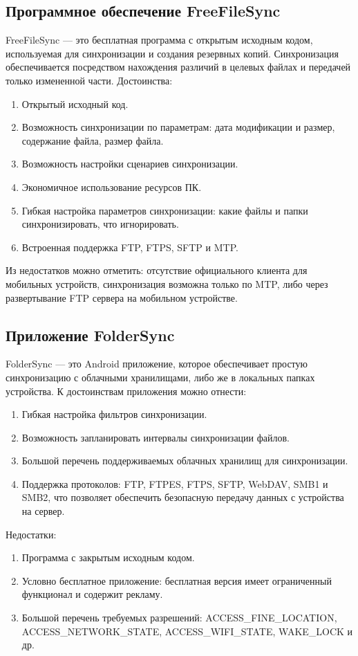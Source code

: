 \subsection{Программное обеспечение FreeFileSync}
FreeFileSync --- это бесплатная программа с открытым исходным кодом, используемая для синхронизации и создания резервных копий\cite{freefilesync}. Синхронизация обеспечивается посредством нахождения различий в целевых файлах и передачей только измененной части.
Достоинства:
\begin{enumerate}
	\item Открытый исходный код.
	\item Возможность синхронизации по параметрам: дата модификации и размер, содержание файла, размер файла.
	\item Возможность настройки сценариев синхронизации.
	\item Экономичное использование ресурсов ПК.
	\item Гибкая настройка параметров синхронизации: какие файлы и папки синхронизировать, что игнорировать.
	\item Встроенная поддержка FTP, FTPS, SFTP и MTP.
\end{enumerate}

Из недостатков можно отметить: отсутствие официального клиента для мобильных устройств, синхронизация возможна только по MTP, либо через развертывание FTP сервера на мобильном устройстве.

\subsection{Приложение FolderSync}
FolderSync --- это Android приложение, которое обеспечивает простую синхронизацию с облачными хранилищами, либо же в локальных папках устройства\cite{foldersync}.
К достоинствам приложения можно отнести:
\begin{enumerate}
	\item Гибкая настройка фильтров синхронизации.
	\item Возможность запланировать интервалы синхронизации файлов.
	\item Большой перечень поддерживаемых облачных хранилищ для синхронизации.
	\item Поддержка протоколов: FTP, FTPES, FTPS, SFTP, WebDAV, SMB1 и SMB2, что позволяет обеспечить безопасную передачу данных с устройства на сервер.
\end{enumerate}
Недостатки:
\begin{enumerate}
	\item Программа с закрытым исходным кодом.
	\item Условно бесплатное приложение: бесплатная версия имеет ограниченный функционал и содержит рекламу.
	\item Большой перечень требуемых разрешений: ACCESS\_FINE\_LOCATION, ACCESS\_NETWORK\_STATE, ACCESS\_WIFI\_STATE, WAKE\_LOCK и др.
\end{enumerate}

